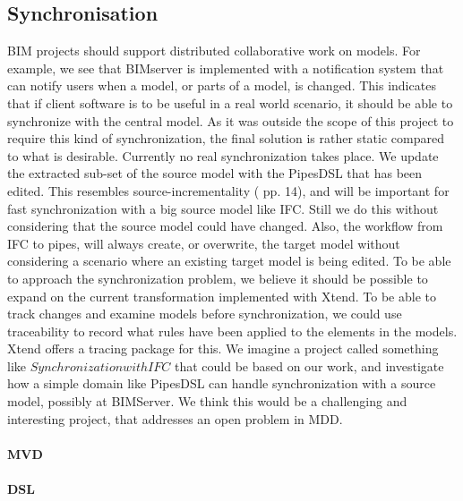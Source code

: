 \subsection{Synchronisation}
    BIM projects should support distributed collaborative work on models. For example, we see that BIMserver is implemented with a notification system that can notify users when a model, or parts of a model, is changed. This indicates that if client software is to be useful in a real world scenario, it should be able to synchronize with the central model. As it was outside the scope of this project to require this kind of synchronization, the final solution is rather static compared to what is desirable. Currently no real synchronization takes place. We update the extracted sub-set of the source model with the PipesDSL that has been edited. This resembles source-incrementality (\cite{czarnecki06} pp. 14), and will be important for fast synchronization with a big source model like IFC. Still we do this without considering that the source model could have changed. Also, the workflow from IFC to pipes, will always create, or overwrite, the target model without considering a scenario where an existing target model is being edited. To be able to approach the synchronization problem, we believe it should be possible to expand on the current transformation implemented with Xtend. To be able to track changes and examine models before synchronization, we could use traceability\cite{czarnecki06} to record what rules have been applied to the elements in the models. Xtend offers a tracing package\cite{xtendtrace} for this. We imagine a project called something like $Synchronization with IFC$ that could be based on our work, and investigate how a simple domain like PipesDSL can handle synchronization with a source model, possibly at BIMServer. We think this would be a challenging and interesting project, that addresses an open problem in MDD.

\paragraph{MVD}

\paragraph{DSL}

